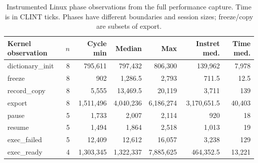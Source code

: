 \begin{table}[t]\centering\small
\begin{tabular}{lrrrrrr}\toprule
Kernel observation & $n$ & Cycle min & Median & Max & Instret med. & Time med.\\\midrule
dictionary\_init & 8 & 795,611 & 797,432 & 806,300 & 139,962 & 7,978\\
freeze & 8 & 902 & 1,286.5 & 2,793 & 711.5 & 12.5\\
record\_copy & 8 & 5,555 & 13,469.5 & 20,119 & 3,711 & 139\\
export & 8 & 1,511,496 & 4,040,236 & 6,186,274 & 3,170,651.5 & 40,403\\
pause & 5 & 1,733 & 2,007 & 2,114 & 920 & 18\\
resume & 5 & 1,494 & 1,864 & 2,518 & 1,013 & 19\\
exec\_failed & 5 & 12,409 & 12,612 & 16,057 & 3,238 & 129\\
exec\_ready & 4 & 1,303,345 & 1,322,337 & 7,885,625 & 464,352.5 & 13,221\\
\bottomrule\end{tabular}
\caption{Instrumented Linux phase observations from the full performance capture. Time is in CLINT ticks. Phases have different boundaries and session sizes; freeze/copy are subsets of export.}\label{tab:costs}
\end{table}
